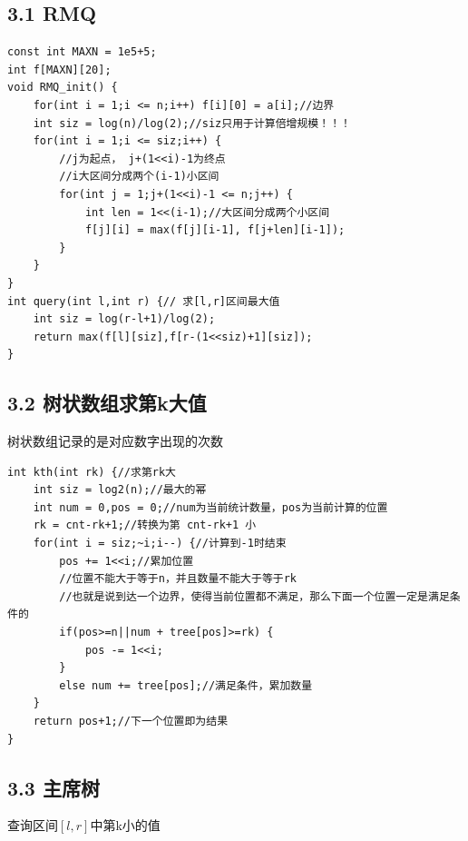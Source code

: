 \documentclass[11pt]{article}		%
\begin{document}
\subsection{3.1 RMQ}\label{rmq}

\begin{verbatim}
const int MAXN = 1e5+5;
int f[MAXN][20];
void RMQ_init() {
    for(int i = 1;i <= n;i++) f[i][0] = a[i];//边界
    int siz = log(n)/log(2);//siz只用于计算倍增规模！！！
    for(int i = 1;i <= siz;i++) {
        //j为起点， j+(1<<i)-1为终点
        //i大区间分成两个(i-1)小区间
        for(int j = 1;j+(1<<i)-1 <= n;j++) {
            int len = 1<<(i-1);//大区间分成两个小区间
            f[j][i] = max(f[j][i-1], f[j+len][i-1]);
        }
    }
}
int query(int l,int r) {// 求[l,r]区间最大值
    int siz = log(r-l+1)/log(2);
    return max(f[l][siz],f[r-(1<<siz)+1][siz]);
}
\end{verbatim}

\subsection{3.2
树状数组求第k大值}\label{ux6811ux72b6ux6570ux7ec4ux6c42ux7b2ckux5927ux503c}

树状数组记录的是对应数字出现的次数

\begin{verbatim}
int kth(int rk) {//求第rk大
    int siz = log2(n);//最大的幂
    int num = 0,pos = 0;//num为当前统计数量，pos为当前计算的位置
    rk = cnt-rk+1;//转换为第 cnt-rk+1 小
    for(int i = siz;~i;i--) {//计算到-1时结束
        pos += 1<<i;//累加位置
        //位置不能大于等于n，并且数量不能大于等于rk
        //也就是说到达一个边界，使得当前位置都不满足，那么下面一个位置一定是满足条件的
        if(pos>=n||num + tree[pos]>=rk) {
            pos -= 1<<i;
        }
        else num += tree[pos];//满足条件，累加数量
    }
    return pos+1;//下一个位置即为结果
}
\end{verbatim}

\subsection{3.3 主席树}\label{ux4e3bux5e2dux6811}

查询区间\([l, r]\)中第k小的值
\end{document}
